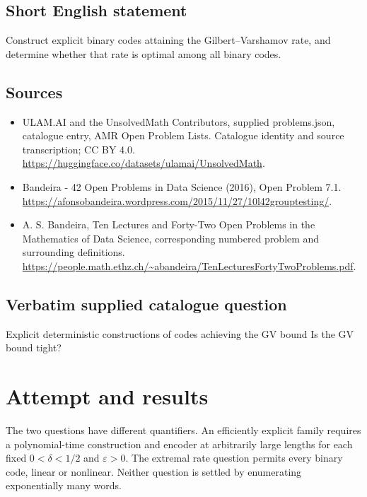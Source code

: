 \documentclass[11pt]{article}
\begin{document}
\subsection{Short English statement}
Construct explicit binary codes attaining the Gilbert–Varshamov rate, and determine whether that rate is optimal among all binary codes.
\subsection{Sources}
\begin{itemize}
\item[S1] ULAM.AI and the UnsolvedMath Contributors, supplied problems.json, catalogue entry, AMR Open Problem Lists. Catalogue identity and source transcription; CC BY 4.0.
\url{https://huggingface.co/datasets/ulamai/UnsolvedMath}.
\item[S2] Bandeira - 42 Open Problems in Data Science (2016), Open Problem 7.1. 
\url{https://afonsobandeira.wordpress.com/2015/11/27/10l42grouptesting/}.
\item[S3] A. S. Bandeira, Ten Lectures and Forty-Two Open Problems in the Mathematics of Data Science, corresponding numbered problem and surrounding definitions.
\url{https://people.math.ethz.ch/~abandeira/TenLecturesFortyTwoProblems.pdf}.
\end{itemize}
\subsection{Verbatim supplied catalogue question}
Explicit deterministic constructions of codes achieving the GV bound Is the GV bound tight?

\section{Attempt and results}
The two questions have different quantifiers. An efficiently explicit family
requires a polynomial-time construction and encoder at arbitrarily large
lengths for each fixed $0<\delta<1/2$ and $\varepsilon>0$.
The extremal rate question permits every binary code, linear or nonlinear.
Neither question is settled by enumerating exponentially many words.
\end{document}
